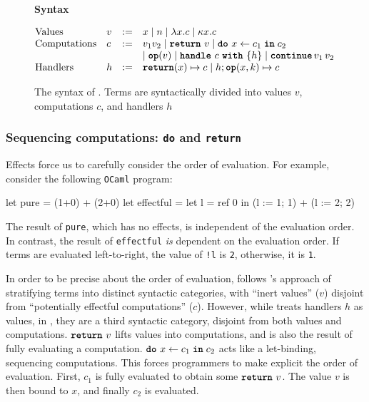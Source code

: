 \begin{figure}
  \begin{eff-desc}
    {\large{\textbf{Syntax}}}
\vspace{2mm}

  $\begin{array}{@{}llll}
  \text{Values} & v & := & x \mid n \mid \lambda x. c \mid \kappa x.c\\

  \text{Computations} & c & := & v_1 v_2 \mid \return{v} \mid \bind{x}{c_1}{c_2} \\
                             &&& \mid \op{v} \mid \handleWith{c}{h} \mid \continue{v_1}{v_2} \\ 
  \text{Handlers} & h & := &\returnHandler{x}{c} \mid h;\opHandler{x}{k}{c}
  \end{array}$
  
  \end{eff-desc}
  \caption{The syntax of \efflang. Terms are syntactically divided into values $v$, computations $c$, and handlers $h$ }
  \label{fig:eff-lang-syntax}
\end{figure}

\subsubsection{Sequencing computations: \texttt{do} and \texttt{return}}
Effects force us to carefully consider the order of evaluation. For example, consider the following \texttt{OCaml} program:
\begin{ocaml}
let pure      = (1+0) + (2+0)
let effectful = let l = ref 0 in (l := 1; 1) + (l := 2; 2)
\end{ocaml}
The result of \texttt{pure}, which has no effects, is independent of the evaluation order. In contrast, the result of \texttt{effectful} \textit{is} dependent on the evaluation order. If terms are evaluated left-to-right, the value of \texttt{!l} is \texttt{2}, otherwise, it is \texttt{1}.

In order to be precise about the order of evaluation, \efflang{} follows \citeauthor{pretnar-15}'s approach of stratifying terms into distinct syntactic categories, with ``inert values'' ($v$) disjoint from ``potentially effectful computations'' ($c$). However, while \citeauthor{pretnar-15} treats handlers $h$ as values, in \efflang{}, they are a third syntactic category, disjoint from both values and computations. $\texttt{\textbf{return}} \,\, {v}$ lifts values into computations, and is also the result of fully evaluating a computation. $\texttt{\textbf{do}} \,\, {x} \leftarrow {c_1} \; \textbf{\texttt{in}} \; {c_2}$ acts like a let-binding, sequencing computations. This forces programmers to make explicit the order of evaluation.  First, $c_1$ is fully evaluated to obtain some $\texttt{\textbf{return}} \,\, {v}$. The value $v$ is then bound to $x$, and finally $c_2$ is evaluated. 

